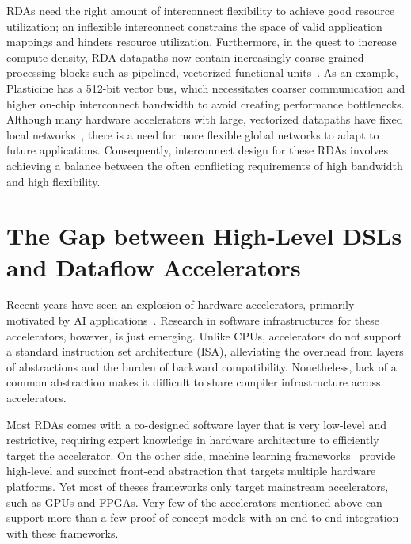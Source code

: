 RDAs need the right amount of interconnect flexibility to achieve good resource utilization;
an inflexible interconnect constrains the space of
valid application mappings and hinders resource utilization.
Furthermore,
in the quest to increase compute density, RDA datapaths now
contain increasingly coarse-grained processing blocks such as pipelined, vectorized functional
units~\cite{plasticine, piperench, xilinx-acap}.
As an example, Plasticine has a 512-bit vector bus, which necessitates coarser communication and higher on-chip interconnect bandwidth to avoid creating performance bottlenecks.
Although many hardware accelerators with large, vectorized datapaths have fixed local networks~\cite{brainwave}, there is a need for more
flexible global networks to adapt to future applications.
Consequently, interconnect design for these RDAs involves achieving a balance between the often conflicting requirements of high bandwidth and high flexibility.

\section{The Gap between High-Level DSLs and Dataflow Accelerators}

Recent years have seen an explosion of hardware accelerators, primarily motivated by AI
applications~\cite{tangram,truenorth,memristive,dadiannao,pudiannao,chen2017eyeriss,eie,reno,convengine,minerva,dnpu,cbrain}.
Research in software infrastructures for these accelerators, however, is just emerging.
Unlike CPUs, accelerators do not support a standard instruction set architecture (ISA), alleviating the overhead from
layers of abstractions and the burden of backward compatibility.
Nonetheless, lack of a common abstraction makes it difficult to share compiler infrastructure
across accelerators.

Most RDAs comes with a co-designed software layer that is very low-level and restrictive,
requiring expert knowledge in hardware architecture to efficiently target the accelerator.
On the other side,
machine learning frameworks~\cite{tensorflow,caffe,pytorch,taco,onnc,tc} provide high-level and
succinct front-end abstraction that targets multiple hardware platforms.
Yet most of theses frameworks only target mainstream accelerators, such as GPUs and FPGAs.
Very few of the accelerators mentioned above can support more than a few proof-of-concept models
with an end-to-end integration with these frameworks.

